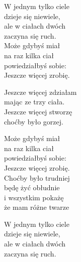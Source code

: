\begin{text}
    W jednym tylko ciele\\
    dzieje się niewiele,\\
    ale w ciałach dwóch\\
    zaczyna się ruch.\\
    \vin Może gdybyś miał\\
    \vin na raz kilka ciał\\
    \vin powiedziałbyś sobie:\\
    \vin Jeszcze więcej zrobię.

    \vin Jeszcze więcej zdziałam\\
    \vin mając ze trzy ciała.\\
    \vin Jeszcze więcej stworzę\\
    \vin choćby było gorzej.

    Może gdybyś miał\\
    na raz kilka ciał\\
    powiedziałbyś sobie:\\
    Jeszcze więcej zrobię.\\
    \vin Choćby było trudniej\\
    \vin będę żyć obłudnie\\
    \vin i wszystkim pokażę\\
    \vin że mam różne twarze

    W jednym tylko ciele\\
    dzieje się niewiele,\\
    ale w ciałach dwóch\\
    zaczyna się ruch.
\end{text}
\begin{chord}

\end{chord}